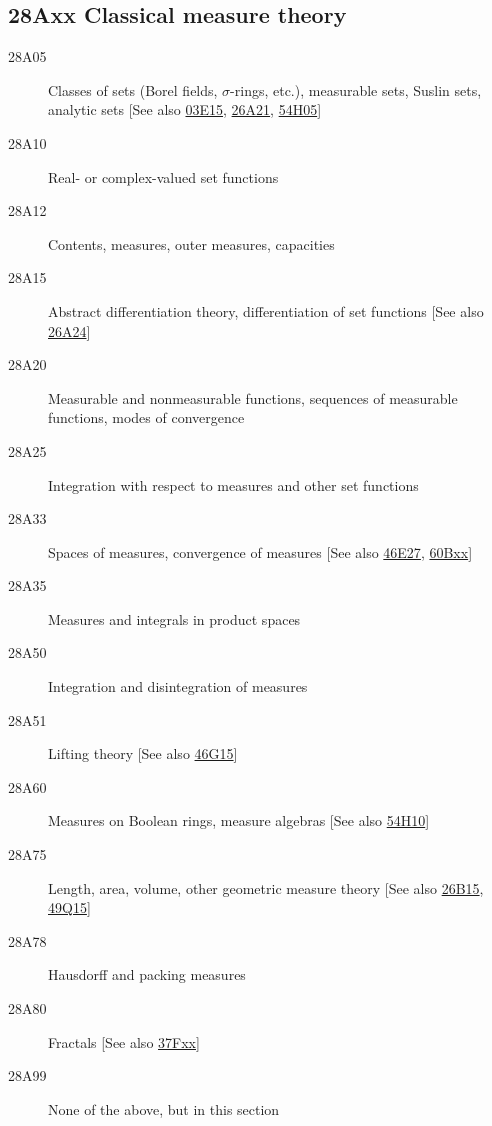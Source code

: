 \subsection*{28Axx  Classical measure theory }\label{28Axx}
\begin{description}  
\item [28A05]\label{28A05} Classes of sets (Borel fields, $\sigma$-rings, etc.), measurable sets, Suslin sets, analytic sets [See also \hyperref[03E15]{03E15}, \hyperref[26A21]{26A21}, \hyperref[54H05]{54H05}]
\item [28A10]\label{28A10} Real- or complex-valued set functions
\item [28A12]\label{28A12} Contents, measures, outer measures, capacities
\item [28A15]\label{28A15} Abstract differentiation theory, differentiation of set functions [See also \hyperref[26A24]{26A24}]
\item [28A20]\label{28A20} Measurable and nonmeasurable functions, sequences of measurable functions, modes of convergence
\item [28A25]\label{28A25} Integration with respect to measures and other set functions
\item [28A33]\label{28A33} Spaces of measures, convergence of measures [See also \hyperref[46E27]{46E27}, \hyperref[60Bxx]{60Bxx}]
\item [28A35]\label{28A35} Measures and integrals in product spaces
\item [28A50]\label{28A50} Integration and disintegration of measures
\item [28A51]\label{28A51} Lifting theory [See also \hyperref[46G15]{46G15}]
\item [28A60]\label{28A60} Measures on Boolean rings, measure algebras [See also \hyperref[54H10]{54H10}]
\item [28A75]\label{28A75} Length, area, volume, other geometric measure theory [See also \hyperref[26B15]{26B15}, \hyperref[49Q15]{49Q15}]
\item [28A78]\label{28A78} Hausdorff and packing measures
\item [28A80]\label{28A80} Fractals [See also \hyperref[37Fxx]{37Fxx}]
\item [28A99]\label{28A99} None of the above, but in this section
\end{description}
